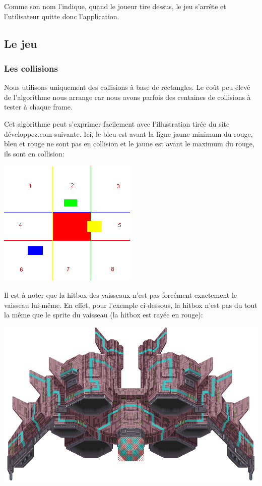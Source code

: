\documentclass{article}
\begin{document}
Comme son nom l'indique, quand le joueur tire dessus, le jeu s'arrête et l'utilisateur quitte donc l'application.

\subsection{Le jeu}

\subsubsection{Les collisions}

Nous utilisons uniquement des collisions à base de rectangles.
Le coût peu élevé de l'algorithme nous arrange car nous avons parfois des
centaines de collisions à tester à chaque frame. \newline


Cet algorithme peut s'exprimer facilement avec l'illustration tirée du
site développez.com suivante. Ici, le bleu est avant la ligne jaune minimum du
rouge, bleu et rouge ne sont pas en collision et le jaune est avant le maximum
du rouge, ils sont en collision:

\begin{center}
\includegraphics[scale= 0.8]{images/collision-boites.png}
\end{center}

Il est à noter que la hitbox des vaisseaux n'est pas forcément exactement le vaisseau lui-même. En effet, pour l'exemple ci-dessous, la hitbox n'est pas du tout la même que le sprite du vaisseau (la hitbox est rayée en rouge):

\begin{center}
\includegraphics[scale= 0.4]{images/carrierhit.png}
\end{center}
\end{document}
